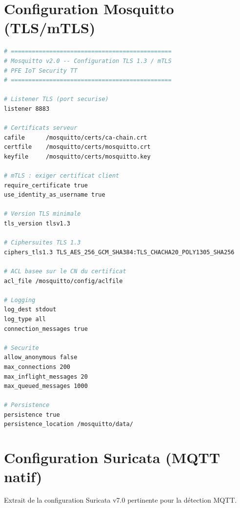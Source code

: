 \section{Configuration Mosquitto (TLS/mTLS)}
\label{sec:config_mosquitto}

\begin{lstlisting}[language=bash, caption={mosquitto.conf --- Broker MQTT avec TLS 1.3 et mTLS}, label={lst:mosquitto_conf}]
# ==============================================
# Mosquitto v2.0 -- Configuration TLS 1.3 / mTLS
# PFE IoT Security TT
# ==============================================

# Listener TLS (port securise)
listener 8883

# Certificats serveur
cafile      /mosquitto/certs/ca-chain.crt
certfile    /mosquitto/certs/mosquitto.crt
keyfile     /mosquitto/certs/mosquitto.key

# mTLS : exiger certificat client
require_certificate true
use_identity_as_username true

# Version TLS minimale
tls_version tlsv1.3

# Ciphersuites TLS 1.3
ciphers_tls1.3 TLS_AES_256_GCM_SHA384:TLS_CHACHA20_POLY1305_SHA256

# ACL basee sur le CN du certificat
acl_file /mosquitto/config/aclfile

# Logging
log_dest stdout
log_type all
connection_messages true

# Securite
allow_anonymous false
max_connections 200
max_inflight_messages 20
max_queued_messages 1000

# Persistence
persistence true
persistence_location /mosquitto/data/
\end{lstlisting}

\section{Configuration Suricata (MQTT natif)}
\label{sec:config_suricata}

Extrait de la configuration Suricata v7.0 pertinente pour la détection MQTT.

